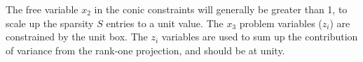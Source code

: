 \documentclass{article}
\begin{document}
The free variable $x_2$ in the conic constraints will generally be greater than 1, to scale up the sparsity $S$ entries to a unit value. The $x_3$ problem variables ($z_i$) are constrained by the unit box. The $z_i$ variables are used to sum up the contribution of variance from the rank-one projection, and should be at unity.
\end{document}
